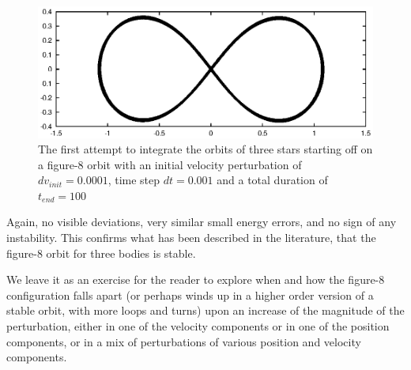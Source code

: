 \begin{figure}[htb]
\centering
\includegraphics[width=4.5in]{chap5/leapfrog3a_0.001_100.ps}
\caption[Three stars on a figure-8 orbit, $dv_{init}=0.0001$, $dt = 0.001$,
$t_{end} = 100$]
{The first attempt to integrate the orbits of three stars starting off
on a figure-8 orbit with an initial velocity perturbation of
$dv_{init}=0.0001$, time step $dt = 0.001$ and a total duration of
$t_{end} = 100$}
\label{fig:leap3a-0.001-100}
\end{figure}

Again, no visible deviations, very similar small energy errors, and no
sign of any instability.  This confirms what has been described in the
literature, that the figure-8 orbit for three bodies is stable.

We leave it as an exercise for the reader to explore when and how the
figure-8 configuration falls apart (or perhaps winds up in a higher
order version of a stable orbit, with more loops and turns) upon an
increase of the magnitude of the perturbation, either in one of the
velocity components or in one of the position components, or in a mix
of perturbations of various position and velocity components.
